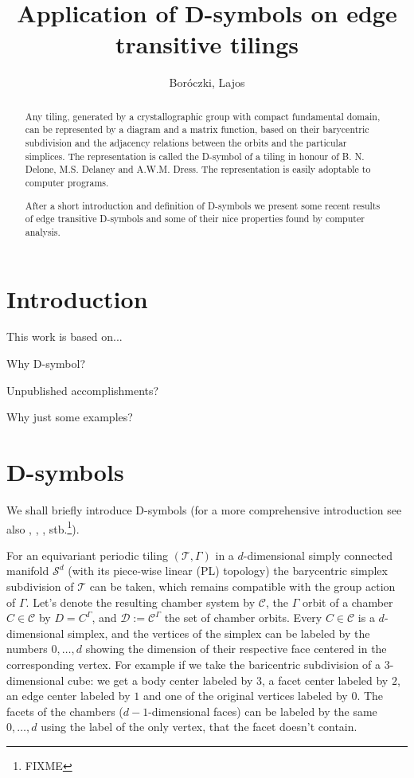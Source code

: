 \documentclass[12pt,a4paper]{article}
\numberwithin{equation}{section}
\theoremstyle{plain}%
\theoremstyle{definition}
\theoremstyle{remark}
\begin{document}
\title{Application of D-symbols on edge transitive tilings}
\author{Boróczki, Lajos}
\maketitle

\begin{abstract}
  Any tiling, generated by a crystallographic group with compact fundamental
  domain, can be represented by a diagram and a matrix function, based on
  their barycentric subdivision and the adjacency relations between the orbits
  and the particular simplices. The representation is called the D-symbol of a
  tiling in honour of B. N. Delone, M.S. Delaney and A.W.M. Dress. The
  representation is easily adoptable to computer programs.

  After a short introduction and definition of D-symbols we 
  present some recent results of edge transitive D-symbols and some of their
  nice properties found by computer analysis.
\end{abstract}

\section{Introduction}
This work is based on...

Why D-symbol?

Unpublished accomplishments?

Why just some examples?

\section{D-symbols}
We shall briefly introduce D-symbols (for a more comprehensive introduction see
also \cite{BSzK02}, \cite{DHM93}, \cite{M96}, stb.\footnote{FIXME}). 

For an equivariant periodic tiling $(\mathcal{T},\Gamma)$ in a $d$-dimensional
simply connected manifold $\mathcal{S}^d$ (with its piece-wise linear (PL)
topology) the barycentric simplex subdivision of $\mathcal{T}$ can be taken,
which remains compatible with the group action of $\Gamma$. Let's denote the
resulting chamber system by $\mathcal{C}$, the $\Gamma$ orbit of a chamber $C\in
\mathcal{C}$ by $D=C^\Gamma$, and $\mathcal{D}:= \mathcal{C}^\Gamma$ the set of
chamber orbits. Every $C\in \mathcal{C}$ is a $d$-dimensional simplex, and the
vertices of the simplex can be labeled by the numbers $0,\ldots,d$ showing the
dimension of their respective face centered in the corresponding vertex. For
example if we take the baricentric subdivision of a $3$-dimensional cube: we get
a body center labeled by $3$, a facet center labeled by $2$, an edge center
labeled by $1$ and one of the original vertices labeled by $0$. The facets of
the chambers ($d-1$-dimensional faces) can be labeled by the same $0,\ldots,d$
using the label of the only vertex, that the facet doesn't contain.
\end{document}
